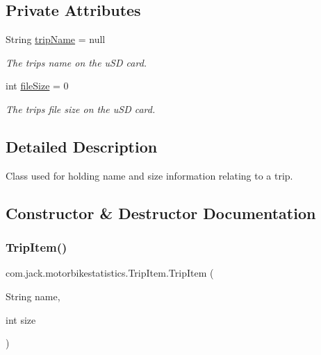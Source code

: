 \subsection*{Private Attributes}
\begin{DoxyCompactItemize}
\item 
\mbox{\label{classcom_1_1jack_1_1motorbikestatistics_1_1_trip_item_a2e678c328ae2972516c2da9d21826359}} 
String \hyperlink{classcom_1_1jack_1_1motorbikestatistics_1_1_trip_item_a2e678c328ae2972516c2da9d21826359}{trip\+Name} = null
\begin{DoxyCompactList}\small\item\em The trips name on the u\+SD card. \end{DoxyCompactList}\item 
\mbox{\label{classcom_1_1jack_1_1motorbikestatistics_1_1_trip_item_ac7b1106a5db61eb17cfd3f314a885a3d}} 
int \hyperlink{classcom_1_1jack_1_1motorbikestatistics_1_1_trip_item_ac7b1106a5db61eb17cfd3f314a885a3d}{file\+Size} = 0
\begin{DoxyCompactList}\small\item\em The trips file size on the u\+SD card. \end{DoxyCompactList}\end{DoxyCompactItemize}


\subsection{Detailed Description}
Class used for holding name and size information relating to a trip. 

\subsection{Constructor \& Destructor Documentation}
\mbox{\label{classcom_1_1jack_1_1motorbikestatistics_1_1_trip_item_a17a6df81af0062b7bf03babb4c7433b0}} 
\subsubsection{\texorpdfstring{Trip\+Item()}{TripItem()}}
{\footnotesize\ttfamily com.\+jack.\+motorbikestatistics.\+Trip\+Item.\+Trip\+Item (\begin{DoxyParamCaption}\item[{String}]{name,  }\item[{int}]{size }\end{DoxyParamCaption})\hspace{0.3cm}{\ttfamily [inline]}}



